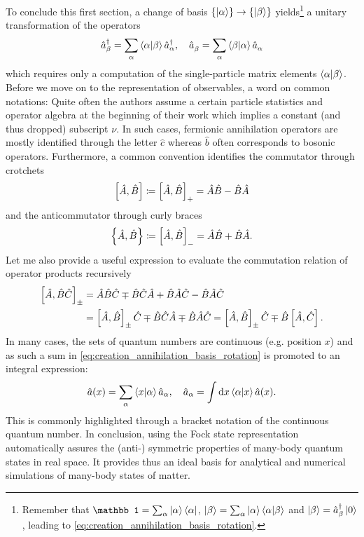 To conclude this first section, a change of basis $\{\ket\alpha\}\rightarrow\{\ket\beta\}$ yields\footnote{Remember that $\mathbb1 = \sum_\alpha\ket{\alpha}\bra{\alpha}$, $\ket{\beta} = \sum_\alpha\ket{\alpha}\braket{\alpha|\beta}$ and $\ket{\beta}=\hat a^\dag_\beta\ket{0}$, leading to \cref{eq:creation_annihilation_basis_rotation}.} a unitary transformation of the operators
\begin{align}
    \hat a^\dag_\beta = \sum_\alpha \braket{\alpha|\beta}\hat a^\dag_\alpha,
    \quad
    \hat a^\pdag_\beta = \sum_\alpha \braket{\beta|\alpha}\hat a^\pdag_\alpha
    \label{eq:creation_annihilation_basis_rotation}
\end{align}
which requires only a computation of the single-particle matrix elements $\braket{\alpha|\beta}$.
Before we move on to the representation of observables, a word on common notations: Quite often the authors assume a certain particle statistics and operator algebra at the beginning of their work which implies a constant (and thus dropped) subscript $\nu$.
In such cases, fermionic annihilation operators are mostly identified through the letter $\hat c$ whereas $\hat b$ often corresponds to bosonic operators.
Furthermore, a common convention identifies the commutator through crotchets
\begin{align}
    \left[\hat A,\hat B\right]\coloneqq\left[ \hat A,\hat B \right]_+ = \hat A\hat B - \hat B\hat A
\end{align}
and the anticommutator through curly braces
\begin{align}
    \left\{ \hat A,\hat B \right\}\coloneqq\left[ \hat A,\hat B \right]_- = \hat A\hat B + \hat B\hat A.
\end{align}
Let me also provide a useful expression to evaluate the commutation relation of operator products recursively
\begin{align}
    \left[ \hat A, \hat B \hat C \right]_\pm
    &= \hat A\hat B\hat C \mp \hat B\hat C\hat A + \hat B\hat A\hat C - \hat B\hat A\hat C
    \\
    &= \left[ \hat A, \hat B \right]_\pm\hat C \mp \hat B\hat C\hat A \mp \hat B\hat A\hat C
    = \left[ \hat A, \hat B \right]_\pm\hat C \mp \hat B\left[ \hat A,\hat C \right].
    \label{eq:recursive_commutation}
\end{align}
In many cases, the sets of quantum numbers are continuous (e.g. position $x$) and as such a sum in \cref{eq:creation_annihilation_basis_rotation} is promoted to an integral expression:
\begin{align}
    \hat a(x) = \sum_\alpha \braket{x | \alpha} \hat a_\alpha,
    \quad
    \hat a_\alpha = \int{\mathrm dx} \braket{\alpha | x} \hat a(x).
\end{align}
This is commonly highlighted through a bracket notation of the continuous quantum number.
In conclusion, using the Fock state representation automatically assures the (anti-) symmetric properties of many-body quantum states in real space.
It provides thus an ideal basis for analytical and numerical simulations of many-body states of matter.
%
%
